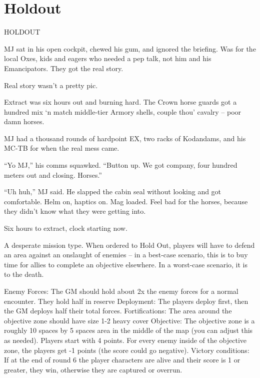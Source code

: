 \section{Holdout}

HOLDOUT

          MJ sat in his open cockpit, chewed his gum, and ignored the briefing. Was for the local Oxes, kids
          and eagers who needed a pep talk, not him and his Emancipators. They got the real story.

          Real story wasn’t a pretty pic.

          Extract was six hours out and burning hard. The Crown horse guards got a hundred mix ‘n match
          middle-tier Armory shells, couple thou’ cavalry -- poor damn horses.

          MJ had a thousand rounds of hardpoint EX, two racks of Kodandams, and his MC-TB for when the
          real mess came.

          “Yo MJ,” his comms squawked. “Button up. We got company, four hundred meters out and closing.
          Horses.”

          “Uh huh,” MJ said. He slapped the cabin seal without looking and got comfortable. Helm on, haptics
          on. Mag loaded. Feel bad for the horses, because they didn’t know what they were getting into.

          Six hours to extract, clock starting now.

A desperate mission type. When ordered to Hold Out, players will have to defend an area against
an onslaught of enemies -- in a best-case scenario, this is to buy time for allies to complete an
objective elsewhere. In a worst-case scenario, it is to the death.




Enemy Forces: The GM should hold about 2x the enemy forces for a normal encounter. They
hold half in reserve
Deployment: The players deploy first, then the GM deploys half their total forces.
Fortifications: The area around the objective zone should have size 1-2 heavy cover
Objective: The objective zone is a roughly 10 spaces by 5 spaces area in the middle of the map
(you can adjust this as needed). Players start with 4 points. For every enemy inside of the
objective zone, the players get -1 points (the score could go negative).
Victory conditions:  If at the end of round 6 the player characters are alive and their score is 1 or
greater, they win, otherwise they are captured or overrun.



